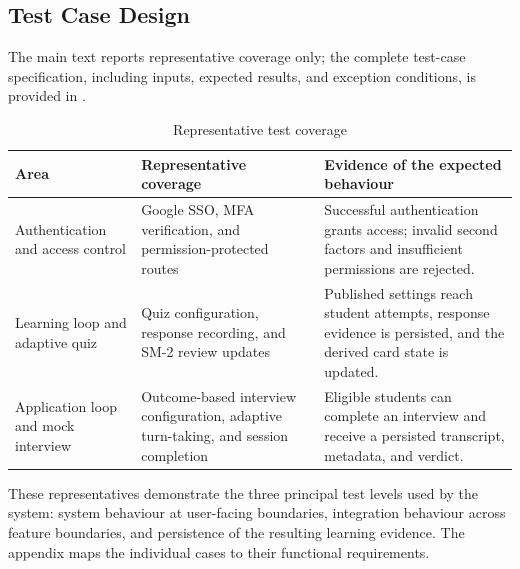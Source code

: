 \subsection{Test Case Design}
\label{sec:testcase_design}

The main text reports representative coverage only; the complete test-case specification, including inputs, expected results, and exception conditions, is provided in .

\begin{table}[H]
\centering
\caption{Representative test coverage}
\label{tab:tc_representative}
\begin{tabularx}{\textwidth}{>{\raggedright\arraybackslash}p{} X X}
\hline
\textbf{Area} & \textbf{Representative coverage} & \textbf{Evidence of the expected behaviour} \\
\hline
Authentication and access control & Google SSO, MFA verification, and permission-protected routes & Successful authentication grants access; invalid second factors and insufficient permissions are rejected. \\
\hline
Learning loop and adaptive quiz & Quiz configuration, response recording, and SM-2 review updates & Published settings reach student attempts, response evidence is persisted, and the derived card state is updated. \\
\hline
Application loop and mock interview & Outcome-based interview configuration, adaptive turn-taking, and session completion & Eligible students can complete an interview and receive a persisted transcript, metadata, and verdict. \\
\hline
\end{tabularx}
\end{table}

These representatives demonstrate the three principal test levels used by the system: system behaviour at user-facing boundaries, integration behaviour across feature boundaries, and persistence of the resulting learning evidence. The appendix maps the individual cases to their functional requirements.
